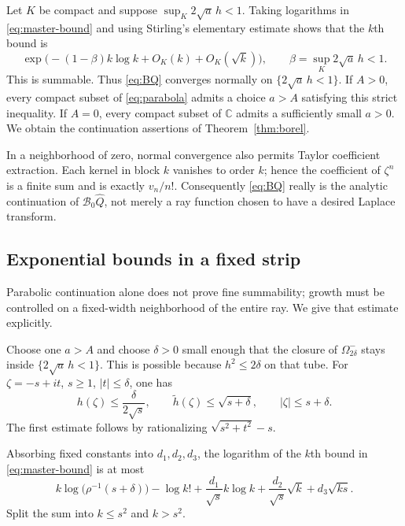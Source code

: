 \documentclass[11pt,a4paper]{article}
\numberwithin{equation}{section}
\theoremstyle{definition}
\theoremstyle{remark}
\newcommand{\C}{\mathbb C}
\newcommand{\Q}{\widehat Q}
\newcommand{\B}{\mathcal B_0}
\begin{document}
Let $K$ be compact and suppose $\sup_K2\sqrt a\,h<1$.  Taking logarithms
in \eqref{eq:master-bound} and using Stirling's elementary estimate shows
that the $k$th bound is
\[
 \exp\bigl(-(1-\beta)k\log k+O_K(k)+O_K(\sqrt k)\bigr),
 \qquad \beta=\sup_K2\sqrt a\,h<1.
\]
This is summable.  Thus \eqref{eq:BQ} converges normally on
$\{2\sqrt a\,h<1\}$.  If $A>0$, every compact subset of
\eqref{eq:parabola} admits a choice $a>A$ satisfying this strict
inequality.  If $A=0$, every compact subset of $\C$ admits a sufficiently
small $a>0$.  We obtain the continuation assertions of
Theorem~\ref{thm:borel}.

In a neighborhood of zero, normal convergence also permits Taylor
coefficient extraction.  Each kernel in block $k$ vanishes to order $k$;
hence the coefficient of $\zeta^n$ is a finite sum and is exactly $v_n/n!$.
Consequently \eqref{eq:BQ} really is the analytic continuation of
$\B\Q$, not merely a ray function chosen to have a desired Laplace
transform.

\subsection{Exponential bounds in a fixed strip}
Parabolic continuation alone does not prove fine summability; growth
must be controlled on a fixed-width neighborhood of the entire ray.
We give that estimate explicitly.

Choose one $a>A$ and choose $\delta>0$ small enough that the closure of
$\Omega^-_{2\delta}$ stays inside $\{2\sqrt a\,h<1\}$.  This is possible
because $h^2\le2\delta$ on that tube.  For
$\zeta=-s+it$, $s\ge1$, $|t|\le\delta$, one has
\begin{equation}
 h(\zeta)\le\frac{\delta}{2\sqrt s},\qquad
 \widetilde h(\zeta)\le\sqrt{s+\delta},\qquad
 |\zeta|\le s+\delta.
 \label{eq:strip-roots}
\end{equation}
The first estimate follows by rationalizing
$\sqrt{s^2+t^2}-s$.

Absorbing fixed constants into $d_1,d_2,d_3$, the logarithm of the
$k$th bound in \eqref{eq:master-bound} is at most
\begin{equation}
 k\log\bigl(\rho^{-1}(s+\delta)\bigr)-\log k!
 +\frac{d_1}{\sqrt s}k\log k
 +\frac{d_2}{\sqrt s}\sqrt k+d_3\sqrt{ks}.
 \label{eq:strip-term}
\end{equation}
Split the sum into $k\le s^2$ and $k>s^2$.
\end{document}

